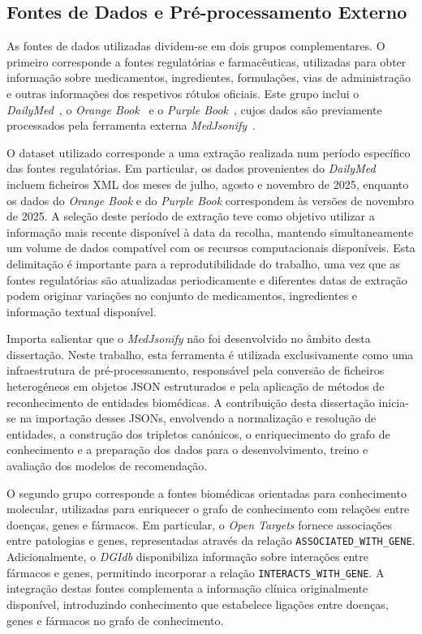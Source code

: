 \subsection{Fontes de Dados e Pré-processamento Externo}
As fontes de dados utilizadas dividem-se em dois grupos complementares. O primeiro corresponde a fontes regulatórias e farmacêuticas, utilizadas para obter informação sobre medicamentos, ingredientes, formulações, vias de administração e outras informações dos respetivos rótulos oficiais. Este grupo inclui o \emph{DailyMed}~\cite{dailymed}, o \emph{Orange Book}~\cite{orangebook} e o \emph{Purple Book}~\cite{purplebook}, cujos dados são previamente processados pela ferramenta externa \emph{MedJsonify}~\cite{pereira2025mapping}.

O dataset utilizado corresponde a uma extração realizada num período específico das fontes regulatórias. Em particular, os dados provenientes do \emph{DailyMed} incluem ficheiros XML dos meses de julho, agosto e novembro de 2025, enquanto os dados do \emph{Orange Book} e do \emph{Purple Book} correspondem às versões de novembro de 2025. A seleção deste período de extração teve como objetivo utilizar a informação mais recente disponível à data da recolha, mantendo simultaneamente um volume de dados compatível com os recursos computacionais disponíveis. Esta delimitação é importante para a reprodutibilidade do trabalho, uma vez que as fontes regulatórias são atualizadas periodicamente e diferentes datas de extração podem originar variações no conjunto de medicamentos, ingredientes e informação textual disponível.

Importa salientar que o \emph{MedJsonify} não foi desenvolvido no âmbito desta dissertação. Neste trabalho, esta ferramenta é utilizada exclusivamente como uma infraestrutura de pré-processamento, responsável pela conversão de ficheiros heterogéneos em objetos JSON estruturados e pela aplicação de métodos de reconhecimento de entidades biomédicas. A contribuição desta dissertação inicia-se na importação desses JSONs, envolvendo a normalização e resolução de entidades, a construção dos tripletos canónicos, o enriquecimento do grafo de conhecimento e a preparação dos dados para o desenvolvimento, treino e avaliação dos modelos de recomendação.

O segundo grupo corresponde a fontes biomédicas orientadas para conhecimento molecular, utilizadas para enriquecer o grafo de conhecimento com relações entre doenças, genes e fármacos. Em particular, o \emph{Open Targets} fornece associações entre patologias e genes, representadas através da relação \texttt{ASSOCIATED\_WITH\_GENE}. Adicionalmente, o \emph{DGIdb} disponibiliza informação sobre interações entre fármacos e genes, permitindo incorporar a relação \texttt{INTERACTS\_WITH\_GENE}. A integração destas fontes complementa a informação clínica originalmente disponível, introduzindo conhecimento que estabelece ligações entre doenças, genes e fármacos no grafo de conhecimento.


